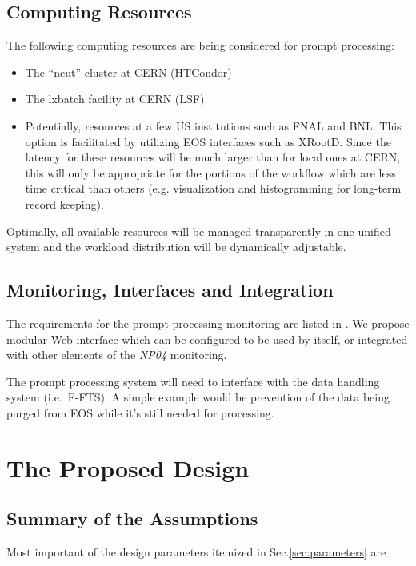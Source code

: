 \documentclass[pdftex,12pt,letter]{article}
\newcommand{\expname}{\textit{NP04}\xspace}
\begin{document}
\subsection{Computing Resources}
The following computing resources are being considered for prompt processing:
\begin{itemize}

\item The ``neut'' cluster  \cite{neut} at CERN (HTCondor)

\item The lxbatch facility \cite{lxbatch} at CERN (LSF)

\item Potentially, resources at a few US institutions such as FNAL and BNL.  This option is facilitated
by utilizing EOS interfaces such as XRootD. Since the latency for these resources will be much larger
than for local ones at CERN, this will only be appropriate for the portions of the workflow which
are less time critical than others (e.g. visualization and histogramming for long-term record keeping).

\end{itemize}

\noindent Optimally, all available resources will be managed transparently in one unified system and
the workload distribution will be dynamically adjustable.

\subsection{Monitoring, Interfaces and Integration}
The requirements for the prompt processing monitoring are listed in \cite{docdb1811}.
We propose modular Web interface which can be configured to be used by itself, or integrated
with other elements of the \expname monitoring. 

The prompt processing system will need to interface with the data handling system (i.e.~F-FTS). A simple example
would be prevention of the data being purged from EOS while it's still needed for processing.

\section{The Proposed Design}
\label{sec:design}
\subsection{Summary of the Assumptions}
Most important of the design parameters itemized in Sec.\ref{sec:parameters} are
\end{document}
